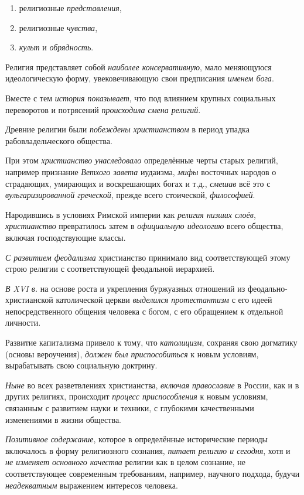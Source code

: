 \documentclass[a4paper,14pt,russian]{extreport}
\begin{document}
\begin{enumerate}
\item религиозные \emph{представления},
\item религиозные \emph{чувства},
\item \emph{культ} и \emph{обрядность}.
\end{enumerate}

Религия представляет собой \emph{наиболее консервативную}, мало меняющуюся идеологическую форму, увековечивающую свои предписания \emph{именем бога}.

Вместе с тем \emph{история показывает}, что под влиянием крупных социальных переворотов и потрясений \emph{происходила смена религий}.

Древние религии были \emph{побеждены христианством} в период упадка рабовладельческого общества.

При этом \emph{христианство унаследовало} определённые черты старых религий, например признание \emph{Ветхого завета} иудаизма, \emph{мифы} восточных народов о страдающих, умирающих и воскрешающих богах и т.д., \emph{смешав} всё это с \emph{вульгаризированной греческой}, прежде всего стоической, \emph{философией}.

Народившись в условиях Римской империи как \emph{религия низших слоёв}, \emph{христианство} превратилось затем в \emph{официальную идеологию} всего общества, включая господствующие классы.

\emph{С развитием феодализма} христианство принимало вид соответствующей этому строю религии с соответствующей феодальной иерархией.

\emph{В XVI в.} на основе роста и укрепления буржуазных отношений из феодально-христианской католической церкви \emph{выделился протестантизм} с его идеей непосредственного общения человека с богом, с его обращением к отдельной личности.

Развитие капитализма привело к тому, что \emph{католицизм}, сохраняя свою догматику (основы вероучения), \emph{должен был приспособиться} к новым условиям, вырабатывать свою социальную доктрину.

\emph{Ныне} во всех разветвлениях христианства, \emph{включая православие} в России, как и в других религиях, происходит \emph{процесс приспособления} к новым условиям, связанным с развитием науки и техники, с глубокими качественными изменениями в жизни общества.

\emph{Позитивное содержание}, которое в определённые исторические периоды включалось в форму религиозного сознания, \emph{питает религию и сегодня}, хотя и \emph{не изменяет основного качества} религии как в целом сознание, не соответствующее современным требованиям, например, научного подхода, будучи \emph{неадекватным} выражением интересов человека.
\end{document}
